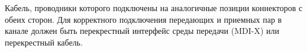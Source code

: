Кабель, проводники которого подключены на аналогичные 
позиции коннекторов с обеих сторон. Для корректного 
подключения передающих и приемных пар в канале должен
быть перекрестный интерфейс среды передачи (MDI-X) или 
перекрестный кабель.